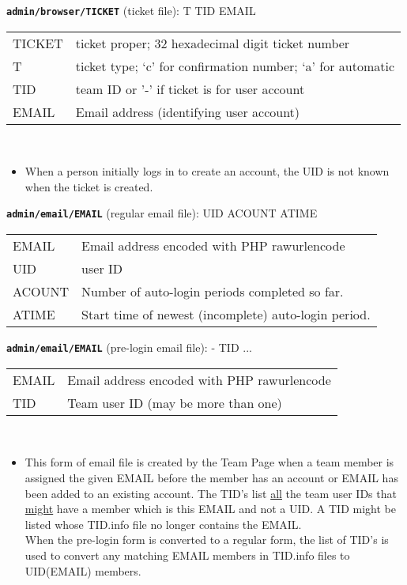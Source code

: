 \documentclass[12pt]{article}
\newenvironment{indpar}[1][0.4in]%
	{\begin{list}{}%
		     {\setlength{\itemsep}{0in}%
		      \setlength{\topsep}{0in}%
		      \setlength{\parsep}{1ex}%
		      \setlength{\labelwidth}{#1}%
		      \setlength{\leftmargin}{#1}%
		      \addtolength{\leftmargin}{\labelsep}}%
	 \item}%
	{\end{list}}
\newenvironment{itemlist}[1][0.2in]%
	{\begin{list}{}{\setlength{\labelwidth}{#1}%
		        \setlength{\leftmargin}{\labelwidth}%
		        \addtolength{\leftmargin}{+0.2in}%
		        \addtolength{\linewidth}{-\labelwidth}%
		        \addtolength{\linewidth}{-0.2in}%
		        \renewcommand{\makelabel}[1]{##1\hfill}}
	 \raggedright}%
	{\end{list}}
\newcommand{\TT}[1]{{\tt \bfseries #1}}
\begin{document}
\begin{indpar}
\begin{itemlist}
\item[\TT{admin/browser/TICKET} (ticket file):] T TID EMAIL
\label{ADMIN/TICKET/TICKET} \\
\begin{tabular}[t]{lp{4.0in}}
TICKET & ticket proper; 32 hexadecimal digit ticket number \\
T & ticket type; `c' for confirmation number; `a' for automatic \\
TID & team ID or '-' if ticket is for user account \\
EMAIL & Email address (identifying user account) \\
\end{tabular}
\\
\begin{itemize}
\item When a person initially logs in to create an account,
the UID is not known when the ticket is created.
\end{itemize}

\item[\TT{admin/email/EMAIL} (regular email file):] UID ACOUNT ATIME
\label{ADMIN/EMAIL/EMAIL} \\
\begin{tabular}[t]{lp{4.0in}}
EMAIL & Email address encoded with PHP rawurlencode \\
UID & user ID \\
ACOUNT & Number of auto-login periods completed so far. \\
ATIME & Start time of newest (incomplete) auto-login period. \\
\end{tabular}

\item[\TT{admin/email/EMAIL} (pre-login email file):] - TID ...
\label{ADMIN/EMAIL/EMAIL-ALTERNATE} \\
\begin{tabular}[t]{lp{4.0in}}
EMAIL & Email address encoded with PHP rawurlencode \\
TID & Team user ID (may be more than one) \\
\end{tabular}
\\
\begin{itemize}
\item This form of email file is created by the Team Page when
a team member is assigned the given EMAIL before the member
has an account or EMAIL has been added to an existing account.
The TID's list \underline{all} the team user IDs that
\underline{might} have a member which is this EMAIL and not a UID.
A TID might be listed whose
TID.info file no longer contains the EMAIL.
\\[1ex]
When the pre-login form is converted to a regular form,
the list of TID's is used to convert any matching EMAIL members
in TID.info files to UID(EMAIL) members.
\end{itemize}


\end{itemlist}
\end{indpar}
\end{document}
